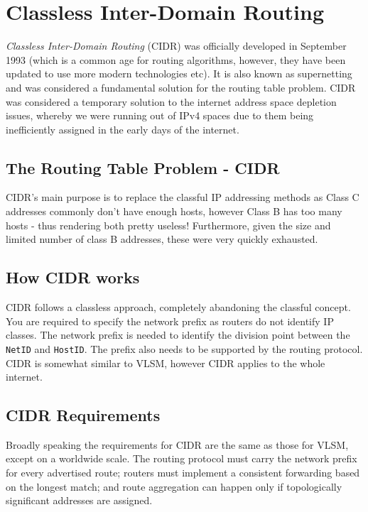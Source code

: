 
\section{Classless Inter-Domain Routing}
\textit{Classless Inter-Domain Routing} (CIDR) was officially developed in September 1993 (which is a common age for routing algorithms, however, they have been updated to use more modern technologies etc). It is also known as supernetting and was considered a fundamental solution for the routing table problem. CIDR was considered a temporary solution to the internet address space depletion issues, whereby we were running out of IPv4 spaces due to them being inefficiently assigned in the early days of the internet.

\subsection{The Routing Table Problem - CIDR}
CIDR's main purpose is to replace the classful IP addressing methods as Class C addresses commonly don't have enough hosts, however Class B has too many hosts - thus rendering both pretty useless! Furthermore, given the size and limited number of class B addresses, these were very quickly exhausted.

\subsection{How CIDR works}
CIDR follows a classless approach, completely abandoning the classful concept. You are required to specify the network prefix as routers do not identify IP classes. The network prefix is needed to identify the division point between the \verb|NetID| and \verb|HostID|. The prefix also needs to be supported by the routing protocol. CIDR is somewhat similar to VLSM, however CIDR applies to the whole internet.

\subsection{CIDR Requirements}
Broadly speaking the requirements for CIDR are the same as those for VLSM, except on a worldwide scale. The routing protocol must carry the network prefix for every advertised route; routers must implement a consistent forwarding based on the longest match; and route aggregation can happen only if topologically significant addresses are assigned.\\

